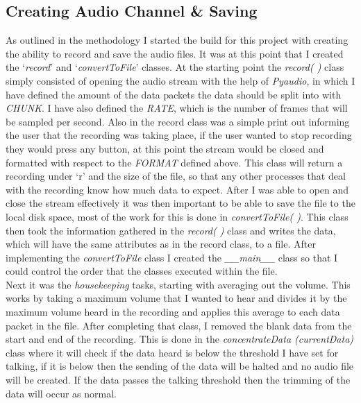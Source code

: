 \documentclass[a4paper,11pt]{report}
\begin{document}
\subsection{Creating Audio Channel \& Saving}
As outlined in the methodology I started the build for this project with creating the ability to record and save the audio files. It was at this point that I created the ‘\textit{record}’ and ‘\textit{convertToFile}’ classes. At the starting point the \textit{record( )} class simply consisted of opening the audio stream with the help of \textit{Pyaudio}, in which I have defined the amount of the data packets the data should be split into with \textit{CHUNK}. I have also defined the \textit{RATE}, which is the number of frames that will be sampled per second. Also in the record class was a simple print out informing the user that the recording was taking place, if the user wanted to stop recording they would press any button, at this point the stream would be closed and formatted with respect to the \textit{FORMAT} defined above. This class will return a recording under ‘r’ and the size of the file, so that any other processes that deal with the recording know how much data to expect. After I was able to open and close the stream effectively it was then important to be able to save the file to the local disk space, most of the work for this is done in \textit{convertToFile( )}. This class then took the information gathered in the \textit{record( )} class and writes the data, which will have the same attributes as in the record class, to a file. After implementing the \textit{convertToFile} class I created the \textit{\_\_main\_\_} class so that I could control the order that the classes executed within the file.\\

Next it was the \textit{housekeeping} tasks, starting with averaging out the volume. This works by taking a maximum volume that I wanted to hear and divides it by the maximum volume heard in the recording and applies this average to each data packet in the file. After completing that class, I removed the blank data from the start and end of the recording. This is done in the \textit{concentrateData (currentData)} class where it will check if the data heard is below the threshold I have set for talking, if it is below then the sending of the data will be halted and no audio file will be created. If the data passes the talking threshold then the trimming of the data will occur as normal.
\end{document}
